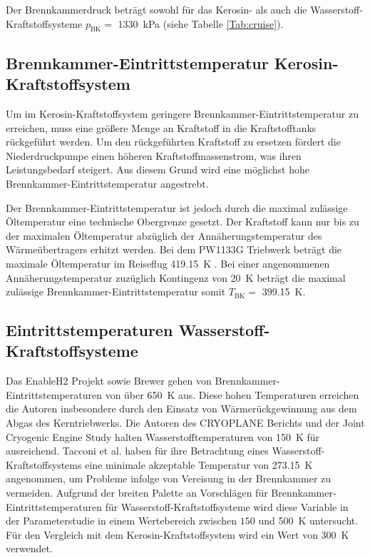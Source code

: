 Der Brennkammerdruck beträgt sowohl für das Kerosin- als auch die Wasserstoff-Kraftstoffsysteme $p_\mathrm{BK}=$ \SI{1330}{\kilo\Pa} (siehe Tabelle \ref{Tab:cruise}).

\subsection{Brennkammer-Eintrittstemperatur Kerosin-Kraftstoffsystem}

Um im Kerosin-Kraftstoffsystem geringere Brennkammer-Eintrittstemperatur zu erreichen, muss eine größere Menge an Kraftstoff in die Kraftstofftanks rückgeführt werden. Um den rückgeführten Kraftstoff zu ersetzen fördert die Niederdruckpumpe einen höheren Kraftstoffmassenstrom, was ihren Leistungsbedarf steigert. Aus diesem Grund wird eine möglichst hohe Brennkammer-Eintrittstemperatur angestrebt. 

Der Brennkammer-Eintrittstemperatur ist jedoch durch die maximal zulässige Öltemperatur eine technische Obergrenze gesetzt. Der Kraftstoff kann nur bis zu der maximalen Öltemperatur abzüglich der Annäherungstemperatur des Wärmeübertragers erhitzt werden. Bei dem PW1133G Triebwerk beträgt die maximale Öltemperatur im Reiseflug \SI{419.15}{\K} \cite{EASA.2018}. Bei einer angenommenen Annäherungstemperatur zuzüglich Kontingenz von \SI{20}{\K} beträgt die maximal zulässige Brennkammer-Eintrittstemperatur somit $T_\mathrm{BK}=$ \SI{399.15}{\K}.

\subsection{Eintrittstemperaturen Wasserstoff-Kraftstoffsysteme}

Das EnableH2 Projekt \cite{Patrao.2023} sowie Brewer \cite{Brewer.1991} gehen von Brennkammer-Eintrittstemperaturen von über \SI{650}{\K} aus. Diese hohen Temperaturen erreichen die Autoren insbesondere durch den Einsatz von Wärmerückgewinnung aus dem Abgas des Kerntriebwerks. Die Autoren des CRYOPLANE Berichts \cite{Scholz.2003} und der Joint Cryogenic Engine Study \cite{SIMON.1994} halten Wasserstofftemperaturen von \SI{150}{\K} für ausreichend. Tacconi et al. \cite{Tacconi.2023} haben für ihre Betrachtung eines Wasserstoff-Kraftstoffsystems eine minimale akzeptable Temperatur von \SI{273.15}{\K} angenommen, um Probleme infolge von Vereisung in der Brennkammer zu vermeiden. Aufgrund der breiten Palette an Vorschlägen für Brennkammer-Eintrittstemperaturen für Wasserstoff-Kraftstoffsysteme wird diese Variable in der Parameterstudie in einem Wertebereich zwischen $150$ und \SI{500}{\K} untersucht. Für den Vergleich mit dem Kerosin-Kraftstoffsystem wird ein Wert von \SI{300}{\K} verwendet.

